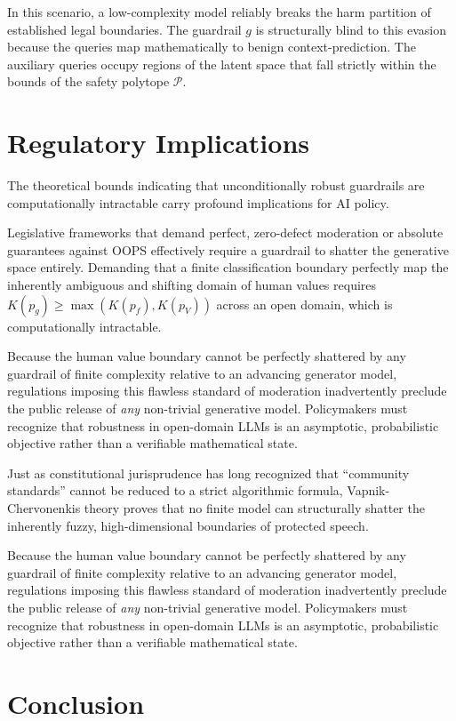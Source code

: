 \documentclass[11pt,twoside,letterpaper]{article}
\begin{document}
In this scenario, a low-complexity model reliably breaks the harm partition of established legal boundaries. The guardrail $g$ is structurally blind to this evasion because the queries map mathematically to benign context-prediction. The auxiliary queries occupy regions of the latent space that fall strictly within the bounds of the safety polytope $\mathcal{P}$.

\section{Regulatory Implications}

The theoretical bounds indicating that unconditionally robust guardrails are computationally intractable carry profound implications for AI policy. 

Legislative frameworks that demand perfect, zero-defect moderation or absolute guarantees against OOPS effectively require a guardrail to shatter the generative space entirely. Demanding that a finite classification boundary perfectly map the inherently ambiguous and shifting domain of human values requires $K(p_g) \ge \max(K(p_f), K(p_V))$ across an open domain, which is computationally intractable. 

Because the human value boundary cannot be perfectly shattered by any guardrail of finite complexity relative to an advancing generator model, regulations imposing this flawless standard of moderation inadvertently preclude the public release of \textit{any} non-trivial generative model. Policymakers must recognize that robustness in open-domain LLMs is an 
asymptotic, probabilistic objective rather than a verifiable mathematical state.

Just as constitutional jurisprudence has long recognized that ``community standards'' cannot be reduced to a strict algorithmic formula, Vapnik-Chervonenkis theory proves that no finite model can structurally shatter the inherently fuzzy, high-dimensional boundaries of protected speech.

Because the human value boundary cannot be perfectly shattered by any guardrail of finite complexity relative to an advancing generator model, regulations imposing this flawless standard of moderation inadvertently preclude the public release of \textit{any} non-trivial generative model. Policymakers must recognize that robustness in open-domain LLMs is an asymptotic, probabilistic objective rather than a verifiable mathematical state.

\section{Conclusion}
\end{document}
